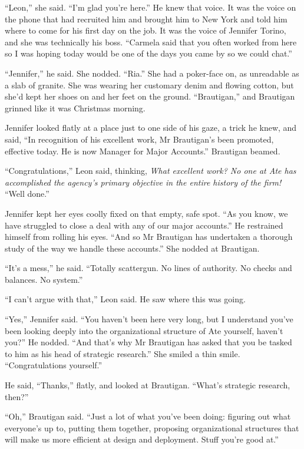 “Leon,” she said. “I'm glad you're here.” He knew that voice. 
It was the voice on the phone that had recruited him and brought him to 
New York and told him where to come for his first day on the job. It 
was the voice of Jennifer Torino, and she was technically his boss. 
“Carmela said that you often worked from here so I was hoping today 
would be one of the days you came by so we could chat.”

“Jennifer,” he said. She nodded. “Ria.” She had a poker-face 
on, as unreadable as a slab of granite. She was wearing her customary 
denim and flowing cotton, but she'd kept her shoes on and her feet on 
the ground. “Brautigan,” and Brautigan grinned like it was 
Christmas morning.

Jennifer looked flatly at a place just to one side of his gaze, a trick 
he knew, and said, “In recognition of his excellent work, Mr 
Brautigan's been promoted, effective today. He is now Manager for Major 
Accounts.” Brautigan beamed.

“Congratulations,” Leon said, thinking, \emph{What excellent work? 
No one at Ate has accomplished the agency's primary objective in the 
entire history of the firm!} “Well done.”

Jennifer kept her eyes coolly fixed on that empty, safe spot. “As you 
know, we have struggled to close a deal with any of our major 
accounts.” He restrained himself from rolling his eyes. “And so Mr 
Brautigan has undertaken a thorough study of the way we handle these 
accounts.” She nodded at Brautigan.

“It's a mess,” he said. “Totally scattergun. No lines of 
authority. No checks and balances. No system.”

“I can't argue with that,” Leon said. He saw where this was going.

“Yes,” Jennifer said. “You haven't been here very long, but I 
understand you've been looking deeply into the organizational structure 
of Ate yourself, haven't you?” He nodded. “And that's why Mr 
Brautigan has asked that you be tasked to him as his head of strategic 
research.” She smiled a thin smile. “Congratulations yourself.”

He said, “Thanks,” flatly, and looked at Brautigan. “What's 
strategic research, then?”

“Oh,” Brautigan said. “Just a lot of what you've been doing: 
figuring out what everyone's up to, putting them together, proposing 
organizational structures that will make us more efficient at design 
and deployment. Stuff you're good at.”

